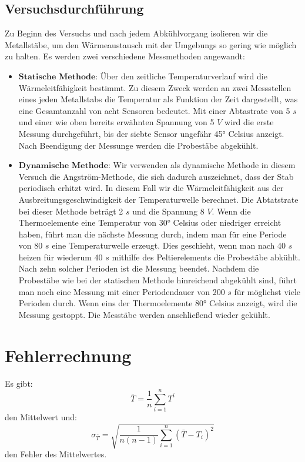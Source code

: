 \subsection{Versuchsdurchführung}
\label{sec:1}
Zu Beginn des Versuchs und nach jedem Abkühlvorgang isolieren wir die Metallstäbe,
um den Wärmeaustausch mit der Umgebungs so gering wie möglich zu halten. Es werden
zwei verschiedene Messmethoden angewandt:
\begin{itemize}
  \item $\textbf{Statische Methode:}$
    Über den zeitliche Temperaturverlauf wird die Wärmeleitfähigkeit bestimmt.
    Zu diesem Zweck werden an zwei Messstellen eines jeden Metallstabs die Temperatur
    als Funktion der Zeit dargestellt, was eine Gesamtanzahl von acht Sensoren bedeutet.
    Mit einer Abtastrate von 5 $\textit{s}$ und einer wie oben
    bereits erwähnten Spannung von 5 $\textit{V}$ wird die erste Messung durchgeführt,
    bis der siebte Sensor ungefähr 45° Celsius anzeigt. Nach Beendigung der Messunge
    werden die Probestäbe abgekühlt.

  \item $\textbf{Dynamische Methode:}$ Wir verwenden als dynamische Methode in diesem
    Versuch die Angström-Methode, die sich dadurch auszeichnet, dass der Stab periodisch erhitzt wird.
    In diesem Fall wir die Wärmeleitfähigkeit aus der Ausbreitungsgeschwindigkeit der
    Temperaturwelle berechnet. Die Abtatstrate bei dieser Methode beträgt 2 $\textit{s}$
    und die Spannung 8 $\textit{V}$.
    Wenn die Thermoelemente eine Temperatur von 30° Celsius oder niedriger erreicht haben,
    führt man die nächste Messung durch, indem man für eine Periode von 80 $\textit{s}$
    eine Temperaturwelle erzeugt. Dies geschieht, wenn man nach 40 $\textit{s}$ heizen für
    wiederum 40 $\textit{s}$ mithilfe des Peltierelements die Probestäbe abkühlt.
    Nach zehn solcher Perioden ist die Messung beendet. Nachdem die Probestäbe wie bei der
    statischen Methode hinreichend abgekühlt sind, führt man noch eine Messung mit einer
    Periodendauer von 200 $\textit{s}$ für möglichst viele %
    Perioden durch. Wenn eins der Thermoelemente 80° Celsius anzeigt, wird die Messung gestoppt.
    Die Messtäbe werden anschließend wieder gekühlt.
\end{itemize}
\section{Fehlerrechnung}
Es gibt:
\begin{equation}
  \bar{T} = \frac{1}{n} \sum_{i=1}^{n} T^{i}
  \label{eqn:5}
\end{equation}
den Mittelwert und:
\begin{equation}
  \sigma_{\bar{T}} = \sqrt{\frac{1}{n(n-1)} \sum_{i=1}^{n}(\bar{T}-T_i)^2}
  \label{eqn:6}
\end{equation}
den Fehler des Mittelwertes.

